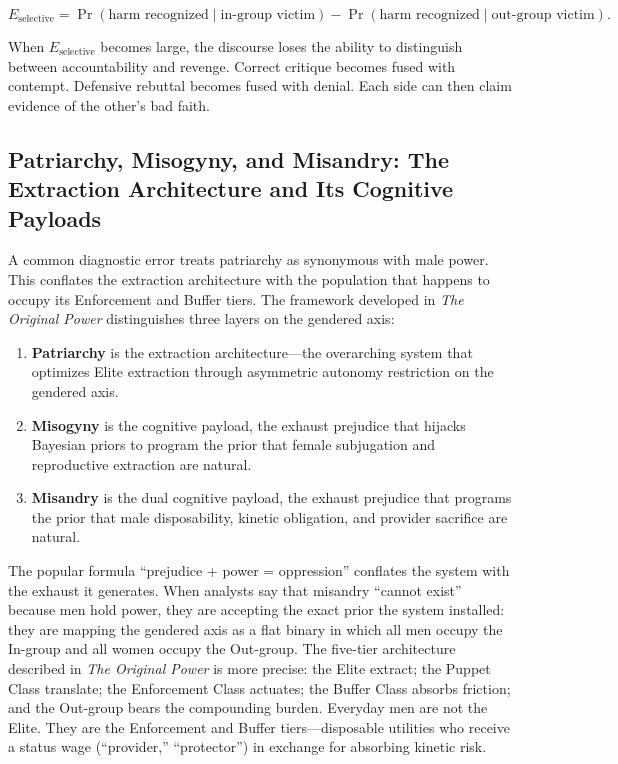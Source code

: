 \documentclass[12pt]{article}
\newcommand{\OP}{\textit{The Original Power}}
\begin{document}
\begin{equation}
  E_{\text{selective}} = \Pr(\text{harm recognized} \mid \text{in-group victim}) -
  \Pr(\text{harm recognized} \mid \text{out-group victim}).
\end{equation}

When $E_{\text{selective}}$ becomes large, the discourse loses the ability to distinguish between accountability and revenge. Correct critique becomes fused with contempt. Defensive rebuttal becomes fused with denial. Each side can then claim evidence of the other's bad faith.

\subsection{Patriarchy, Misogyny, and Misandry: The Extraction Architecture and Its Cognitive Payloads}

A common diagnostic error treats patriarchy as synonymous with male power. This conflates the extraction architecture with the population that happens to occupy its Enforcement and Buffer tiers. The framework developed in \OP{} distinguishes three layers on the gendered axis:

\begin{enumerate}
  \item \textbf{Patriarchy} is the extraction architecture---the overarching system that optimizes Elite extraction through asymmetric autonomy restriction on the gendered axis.
  \item \textbf{Misogyny} is the cognitive payload, the exhaust prejudice that hijacks Bayesian priors to program the prior that female subjugation and reproductive extraction are natural.
  \item \textbf{Misandry} is the dual cognitive payload, the exhaust prejudice that programs the prior that male disposability, kinetic obligation, and provider sacrifice are natural.
\end{enumerate}

The popular formula ``prejudice + power = oppression'' conflates the system with the exhaust it generates. When analysts say that misandry ``cannot exist'' because men hold power, they are accepting the exact prior the system installed: they are mapping the gendered axis as a flat binary in which all men occupy the In-group and all women occupy the Out-group. The five-tier architecture described in \OP{} is more precise: the Elite extract; the Puppet Class translate; the Enforcement Class actuates; the Buffer Class absorbs friction; and the Out-group bears the compounding burden. Everyday men are not the Elite. They are the Enforcement and Buffer tiers---disposable utilities who receive a status wage (``provider,'' ``protector'') in exchange for absorbing kinetic risk.
\end{document}
